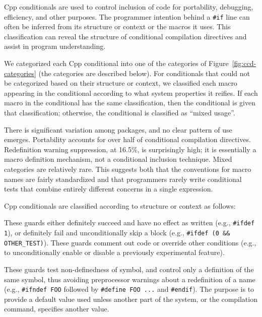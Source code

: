 \documentclass[10pt]{article}
\begin{document}
Cpp conditionals are used to control inclusion of code for portability,
debugging, efficiency, and other purposes.  The programmer intention behind
a {\tt \#if} line can often be inferred from its structure or context or
the macros it uses.  This classification can reveal the structure of
conditional compilation directives and assist in program understanding.

We categorized each Cpp conditional into one of the categories of
Figure~\ref{fig:ccd-categories} (the categories are described below).  For
conditionals that could not be categorized based on their structure or
context, we classified each macro appearing in the conditional according to
what system properties it reifies.  If each macro in the conditional has the
same classification, then the conditional is given that classification;
otherwise, the conditional is classified as ``mixed usage''.

There is significant variation among packages, and no clear pattern of use
emerges.  Portability accounts for over half of conditional compilation
directives.  Redefinition warning suppression, at 16.5\%, is surprisingly
high; it is essentially a macro definition mechanism, not a conditional
inclusion technique.  Mixed categories are relatively rare.  This suggests
both that the conventions for macro names are fairly standardized and that
programmers rarely write conditional tests that combine entirely different
concerns in a single expression.


Cpp conditionals are classified according to structure or context as follows:
\begin{description}\itemsep 0pt \parskip 0pt
\item[Commenting] These guards either definitely succeed and
  have no effect as written (e.g., \texttt{\#ifdef 1}), or definitely fail
  and unconditionally skip a block (e.g., {\tt \#ifdef (0 \&\&
  \verb|OTHER_TEST|)}).  These guards comment out code or override other
  conditions (e.g., to unconditionally enable or disable a previously experimental
  feature).
      
\item[Redefinition suppression] These guards test non-definedness of
  symbol, and control only a definition of the same symbol, thus avoiding
  preprocessor warnings about a redefinition of a name (e.g.,
  \texttt{\#ifndef FOO} followed by \texttt{\#define FOO ...} and
  \texttt{\#endif}).  
  The purpose is to provide a default value used unless another part of the
  system, or the compilation command, specifies another value.

\end{description}
\end{document}

